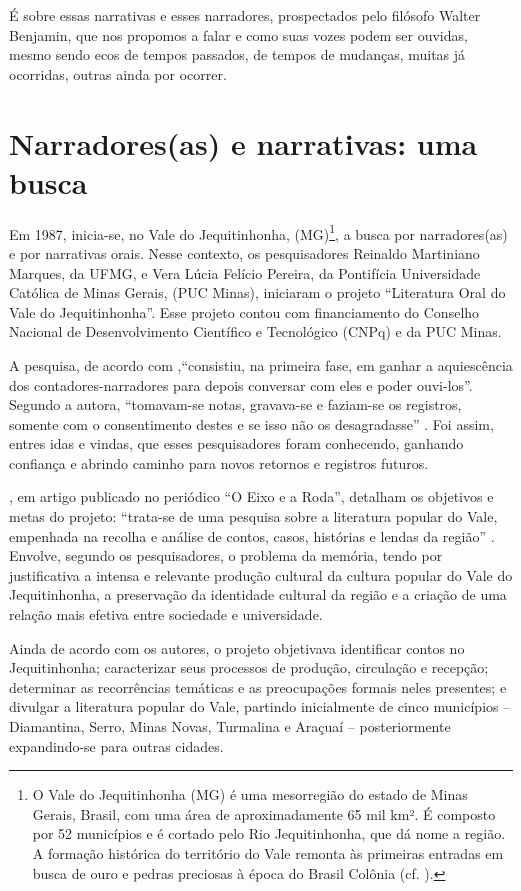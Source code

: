 \documentclass[portuguese]{textolivre}
\begin{document}
É sobre essas narrativas e esses narradores, prospectados pelo filósofo Walter Benjamin, que nos propomos a falar e como suas vozes podem ser ouvidas, mesmo sendo ecos de tempos passados, de tempos de mudanças, muitas já ocorridas, outras ainda por ocorrer.

\section{Narradores(as) e narrativas: uma busca}
Em 1987, inicia-se, no Vale do Jequitinhonha, (MG)\footnote{O Vale do Jequitinhonha (MG) é uma mesorregião do estado de Minas Gerais, Brasil, com uma área de aproximadamente 65 mil km². É composto por 52 municípios e é cortado pelo Rio Jequitinhonha, que dá nome a região. A formação histórica do território do Vale remonta às primeiras entradas em busca de ouro e pedras preciosas à época do Brasil Colônia (cf. \textcite{Poletto2025}).}, a busca por narradores(as) e por narrativas orais. Nesse contexto, os pesquisadores Reinaldo Martiniano Marques, da UFMG, e Vera Lúcia Felício Pereira, da Pontifícia Universidade Católica de Minas Gerais, (PUC Minas), iniciaram o projeto “Literatura Oral do Vale do Jequitinhonha”. Esse projeto contou com financiamento do Conselho Nacional de Desenvolvimento Científico e Tecnológico (CNPq) e da PUC Minas.

A pesquisa, de acordo com \textcite[p.~18]{Pereira1996},“consistiu, na primeira fase, em ganhar a aquiescência dos contadores-narradores para depois conversar com eles e poder ouvi-los”. Segundo a autora, “tomavam-se notas, gravava-se e faziam-se os registros, somente com o consentimento destes e se isso não os desagradasse” \cite[p. 18]{Pereira1996}. Foi assim, entres idas e vindas, que esses pesquisadores foram conhecendo, ganhando confiança e abrindo caminho para novos retornos e registros futuros.

 \textcite{MarquesPereira1988}, em artigo publicado no periódico “O Eixo e a Roda”, detalham os objetivos e metas do projeto: “trata-se de uma pesquisa sobre a literatura popular do Vale, empenhada na recolha e análise de contos, casos, histórias e lendas da região” \cite[p. 173]{MarquesPereira1988}. Envolve, segundo os pesquisadores, o problema da memória, tendo por justificativa a intensa e relevante produção cultural da cultura popular do Vale do Jequitinhonha, a preservação da identidade cultural da região e a criação de uma relação mais efetiva entre sociedade e universidade.
 
Ainda de acordo com os autores, o projeto objetivava identificar contos no Jequitinhonha; caracterizar seus processos de produção, circulação e recepção; determinar as recorrências temáticas e as preocupações formais neles presentes; e divulgar a literatura popular do Vale, partindo inicialmente de cinco municípios – Diamantina, Serro, Minas Novas, Turmalina e Araçuaí – posteriormente expandindo-se para outras cidades.
\end{document}
